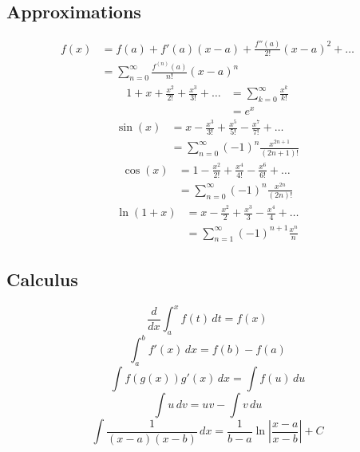 \documentclass[nobib]{tufte-handout}
\begin{document}
\subsection{Approximations}
\begin{align}
    f(x) & = f(a) + f'(a)(x - a) + \frac{f''(a)}{2!}(x - a)^2 + \dots \\
         & = \sum_{n=0}^{\infty} \frac{f^{(n)}(a)}{n!}(x - a)^n
\end{align}
\begin{align}
    1 + x + \frac{x^2}{2!} + \frac{x^3}{3!} + \dots & = \sum_{k=0}^{\infty} \frac{x^k}{k!} \\
                                                    & = e^x
\end{align}
\begin{align}
    \sin(x) & = x - \frac{x^3}{3!} + \frac{x^5}{5!} - \frac{x^7}{7!} + \dots \\
            & = \sum_{n=0}^{\infty} (-1)^n \frac{x^{2n+1}}{(2n+1)!}
\end{align}
\begin{align}
    \cos(x) & = 1 - \frac{x^2}{2!} + \frac{x^4}{4!} - \frac{x^6}{6!} + \dots \\
            & = \sum_{n=0}^{\infty} (-1)^n \frac{x^{2n}}{(2n)!}
\end{align}
\begin{align}
    \ln(1 + x) & = x - \frac{x^2}{2} + \frac{x^3}{3} - \frac{x^4}{4} + \dots \\
               & = \sum_{n=1}^{\infty} (-1)^{n+1} \frac{x^n}{n}
\end{align}

\subsection{Calculus}
\begin{equation}
    \frac{d}{dx} \int_{a}^{x} f(t)\,dt = f(x)
\end{equation}
\begin{equation}
    \int_{a}^{b} f'(x)\,dx = f(b) - f(a)
\end{equation}
\begin{equation}
    \int f(g(x))g'(x)\,dx = \int f(u)\,du
\end{equation}
\begin{equation}
    \int u\,dv = uv - \int v\,du
\end{equation}
\begin{equation}
    \int \frac{1}{(x-a)(x-b)}\,dx = \frac{1}{b-a} \ln\left|\frac{x-a}{x-b}\right| + C
\end{equation}
\end{document}
